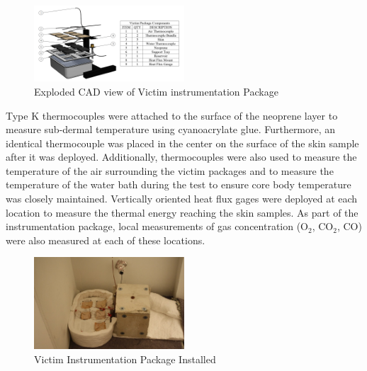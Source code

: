 \documentclass[12pt,oneside]{book}
\begin{document}
\begin{figure}[H]
\centering
\includegraphics[width=0.5\textwidth]{../0_Images/Instrumentation/Burn_Measurements/Skin_Burn_Assessment_Package}
\caption{Exploded CAD view of Victim instrumentation Package}
\label{fig:inst_SBA}
\end{figure}

Type K thermocouples were attached to the surface of the neoprene layer to measure sub-dermal temperature using cyanoacrylate glue.  Furthermore, an identical thermocouple was placed in the center on the surface of the skin sample after it was deployed.  Additionally, thermocouples were also used to measure the temperature of the air surrounding the victim packages and to measure the temperature of the water bath during the test to ensure core body temperature was closely maintained.  Vertically oriented heat flux gages were deployed at each location to measure the thermal energy reaching the skin samples.  As part of the instrumentation package, local measurements of gas concentration (O$_2$, CO$_2$, CO) were also measured at each of these locations.

\begin{figure}[H]
\centering
\includegraphics[width=0.5\textwidth]{../0_Images/Instrumentation/Burn_Measurements/SBA_Deployed}
\caption{Victim Instrumentation Package Installed}
\label{fig:inst_SBA_deployed}
\end{figure}
\end{document}
